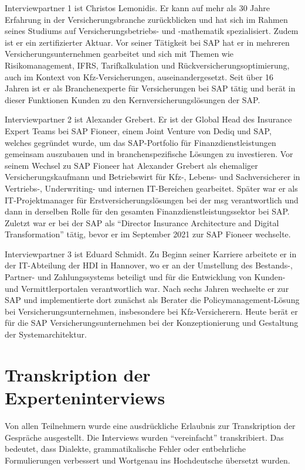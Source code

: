 Interviewpartner 1 ist Christos Lemonidis. Er kann auf mehr als 30 Jahre Erfahrung in der Versicherungsbranche zurückblicken und hat sich im Rahmen seines Studiums auf Versicherungsbetriebs- und -mathematik spezialisiert. Zudem ist er ein zertifizierter Aktuar. Vor seiner Tätigkeit bei SAP hat er in mehreren Versicherungsunternehmen gearbeitet und sich mit Themen wie Risikomanagement, IFRS, Tarifkalkulation und Rückversicherungsoptimierung, auch im Kontext von Kfz-Versicherungen, auseinandergesetzt. Seit über 16 Jahren ist er als Branchenexperte für Versicherungen bei SAP tätig und berät in dieser Funktionen Kunden zu den Kernversicherungslösungen der SAP.  

Interviewpartner 2 ist Alexander Grebert. Er ist der Global Head des Insurance Expert Teams bei SAP Fioneer, einem Joint Venture von Dediq und SAP, welches gegründet wurde, um das SAP-Portfolio für Finanzdienstleistungen gemeinsam auszubauen und in branchenspezifische Lösungen zu investieren. Vor seinem Wechsel zu SAP Fioneer hat Alexander Grebert als ehemaliger Versicherungskaufmann und Betriebswirt für Kfz-, Lebens- und Sachversicherer in Vertriebs-, Underwriting- und internen IT-Bereichen gearbeitet. Später war er als IT-Projektmanager für Erstversicherungslösungen bei der msg verantwortlich und dann in derselben Rolle für den gesamten Finanzdienstleistungssektor bei SAP. Zuletzt war er bei der SAP als \enquote{Director Insurance Architecture and Digital Transformation} tätig, bevor er im September 2021 zur SAP Fioneer wechselte.

Interviewpartner 3 ist Eduard Schmidt. Zu Beginn seiner Karriere arbeitete er in der IT-Abteilung der HDI in Hannover, wo er an der Umstellung des Bestands-, Partner- und Zahlungssystems beteiligt und für die Entwicklung von Kunden- und Vermittlerportalen verantwortlich war. Nach sechs Jahren wechselte er zur SAP und implementierte dort zunächst als Berater die Policymanagement-Lösung bei Versicherungsunternehmen, insbesondere bei Kfz-Versicherern. Heute berät er für die SAP Versicherungsunternehmen bei der Konzeptionierung und Gestaltung der Systemarchitektur.

\section{Transkription der Experteninterviews}

Von allen Teilnehmern wurde eine ausdrückliche Erlaubnis zur Transkription der Gespräche ausgestellt. Die Interviews wurden \enquote{vereinfacht} transkribiert. Das bedeutet, dass Dialekte, grammatikalische Fehler oder entbehrliche Formulierungen verbessert und Wortgenau ins Hochdeutsche übersetzt wurden.\autocite[Vgl.][S. 292]{TAUSENDPFUND2020}

